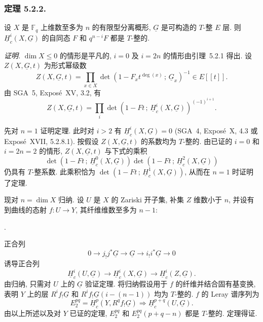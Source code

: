 \subsubsection*{定理 5.2.2.}
设 $X$ 是 $\mathbb F_q$ 上维数至多为 $n$ 的有限型分离概形,
$\underline G$ 是可构造的 $T$-整 $E$ 层. 则 $\underline H_c^i(X,\underline G)$
的自同态 $F$ 和 $q^{n-i}F$ 都是 $T$-整的.

\medskip
\noindent\emph{证明.}
$\dim X\leq0$ 的情形是平凡的, $i=0$ 及 $i=2n$ 的情形由引理~5.2.1 得出.
设 $Z(X,\underline G,t)$ 为形式幂级数
\[
Z(X,\underline G,t)=
\prod_{x\in X}\det\!\left(1-F_xt^{\deg(x)}\,;\,\underline G_x\right)^{-1}
\in E[[t]].
\]
由 SGA~5, Expos\'e~XV, 3.2, 有
\begin{equation}\tag{5.2.3}
Z(X,\underline G,t)=
\prod_i\det\!\left(1-Ft\,;\,\underline H_c^i(X,\underline G)\right)^{(-1)^{i+1}}.
\end{equation}

先对 $n=1$ 证明定理. 此时对 $i>2$ 有 $\underline H_c^i(X,\underline G)=0$
(SGA~4, Expos\'e~X, 4.3 或 Expos\'e~XVII, 5.2.8.1).
按假设 $Z(X,\underline G,t)$ 的系数均为 $T$-整的. 由已证的 $i=0$ 和 $i=2n=2$ 的情形,
$Z(X,\underline G,t)$ 与下式的乘积
\[
\det\!\left(1-Ft\,;\,\underline H_c^0(X,\underline G)\right)
\det\!\left(1-Ft\,;\,\underline H_c^2(X,\underline G)\right)
\]
仍具有 $T$-整系数. 此乘积恰为 $\det(1-Ft\,;\,\underline H_c^1(X,\underline G))$,
从而在 $n=1$ 时证明了定理.

现对 $n=\dim X$ 归纳. 设 $U$ 是 $X$ 的 Zariski 开子集, 补集 $Z$ 维数小于 $n$,
并设有到曲线的态射 $f:U\longrightarrow Y$, 其纤维维数至多为 $n-1$:
\begin{center}
\qquad .
\end{center}
正合列
\[
0\longrightarrow j_!j^*\underline G\longrightarrow\underline G
\longrightarrow i_!i^*\underline G\longrightarrow0
\]
诱导正合列
\[
\underline H_c^i(U,\underline G)\longrightarrow
\underline H_c^i(X,\underline G)\longrightarrow
\underline H_c^i(Z,\underline G).
\]
由归纳, 只需对 $U$ 上的 $\underline G$ 验证定理.
将归纳假设用于 $f$ 的纤维并结合固有基变换, 表明 $Y$ 上的层
$R^if_!\underline G$ 和 $R^if_!\underline G(i-(n-1))$ 均为 $T$-整的.
$f$ 的 Leray 谱序列为
\[
E_2^{pq}=\underline H_c^p(Y,R^qf_!\underline G)
\Longrightarrow\underline H_c^{p+q}(U,\underline G).
\]
由以上所述以及对 $Y$ 已证的定理, $E_2^{pq}$ 和 $E_2^{pq}(p+q-n)$ 都是 $T$-整的.
定理得证.

